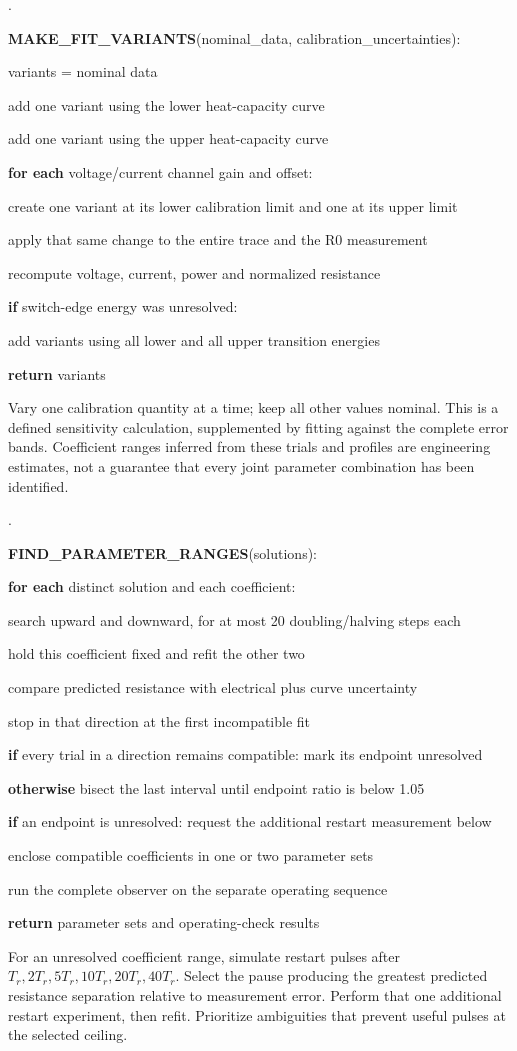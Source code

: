 \documentclass[11pt,letterpaper]{article}
\newcounter{pseudoline}
\newenvironment{pseudocode}{%
  \par\begingroup\small
  \setcounter{pseudoline}{0}
  \begin{list}{\arabic{pseudoline}.}{%
    \usecounter{pseudoline}
    \setlength{\leftmargin}{2.5em}
    \setlength{\labelwidth}{1.9em}
    \setlength{\labelsep}{0.6em}
    \setlength{\itemsep}{0.15em}
    \setlength{\parsep}{0pt}
    \setlength{\topsep}{0.35em}}%
  }{\end{list}\endgroup\par}
\newcommand{\pcstep}[2]{%
  \item \hspace*{#1em}%
  \parbox[t]{\dimexpr\linewidth-#1em\relax}{\raggedright #2\strut}}
\begin{document}
\begin{pseudocode}
\pcstep{0.0}{\textbf{MAKE\_\allowbreak{}FIT\_\allowbreak{}VARIANTS}(nominal\_\allowbreak{}data, calibration\_\allowbreak{}uncertainties):}
\pcstep{1.0}{variants = nominal data}
\pcstep{1.0}{add one variant using the lower heat-capacity curve}
\pcstep{1.0}{add one variant using the upper heat-capacity curve}
\pcstep{1.0}{\textbf{for each} voltage/current channel gain and offset:}
\pcstep{2.0}{create one variant at its lower calibration limit and one at its upper limit}
\pcstep{2.0}{apply that same change to the entire trace and the R0 measurement}
\pcstep{2.0}{recompute voltage, current, power and normalized resistance}
\pcstep{1.0}{\textbf{if} switch-edge energy was unresolved:}
\pcstep{2.0}{add variants using all lower and all upper transition energies}
\pcstep{1.0}{\textbf{return} variants}
\end{pseudocode}

Vary one calibration quantity at a time; keep all other values nominal. This is a defined sensitivity calculation, supplemented by fitting against the complete error bands. Coefficient ranges inferred from these trials and profiles are engineering estimates, not a guarantee that every joint parameter combination has been identified.

\begin{pseudocode}
\pcstep{0.0}{\textbf{FIND\_\allowbreak{}PARAMETER\_\allowbreak{}RANGES}(solutions):}
\pcstep{1.0}{\textbf{for each} distinct solution and each coefficient:}
\pcstep{2.0}{search upward and downward, for at most 20 doubling/halving steps each}
\pcstep{3.0}{hold this coefficient fixed and refit the other two}
\pcstep{3.0}{compare predicted resistance with electrical plus curve uncertainty}
\pcstep{3.0}{stop in that direction at the first incompatible fit}
\pcstep{2.0}{\textbf{if} every trial in a direction remains compatible: mark its endpoint unresolved}
\pcstep{2.0}{\textbf{otherwise} bisect the last interval until endpoint ratio is below 1.05}
\pcstep{1.0}{\textbf{if} an endpoint is unresolved: request the additional restart measurement below}
\pcstep{1.0}{enclose compatible coefficients in one or two parameter sets}
\pcstep{1.0}{run the complete observer on the separate operating sequence}
\pcstep{1.0}{\textbf{return} parameter sets and operating-check results}
\end{pseudocode}

For an unresolved coefficient range, simulate restart pulses after \(T_r,2T_r,5T_r,10T_r,20T_r,40T_r\). Select the pause producing the greatest predicted resistance separation relative to measurement error. Perform that one additional restart experiment, then refit. Prioritize ambiguities that prevent useful pulses at the selected ceiling.
\end{document}
